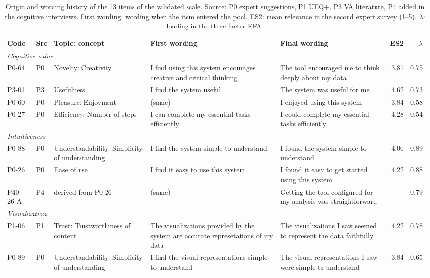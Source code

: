 \begin{table}[tbp]
\centering
\caption{Origin and wording history of the 13 items of the validated scale. Source: P0 expert suggestions, P1 UEQ+, P3 VA literature, P4 added in the cognitive interviews. First wording: wording when the item entered the pool. ES2: mean relevance in the second expert survey (1--5). $\lambda$: loading in the three-factor EFA.}
\label{tab:final-items-history}
\footnotesize
\begin{tabular}{llp{2.6cm}p{4.6cm}p{4.6cm}rr}
\toprule
Code & Src & Topic: concept & First wording & Final wording & ES2 & $\lambda$ \\
\midrule
\multicolumn{7}{l}{\textit{Cognitive value}} \\
P0-64 & P0 & Novelty: Creativity & I find using this system encourages creative and critical thinking & The tool encouraged me to think deeply about my data & 3.81 & 0.75 \\
P3-01 & P3 & Usefulness & I find the system useful & The system was useful for me & 4.62 & 0.73 \\
P0-60 & P0 & Pleasure: Enjoyment & (same) & I enjoyed using this system & 3.84 & 0.58 \\
P0-27 & P0 & Efficiency: Number of steps & I can complete my essential tasks efficiently & I could complete my essential tasks efficiently & 4.28 & 0.54 \\
\midrule
\multicolumn{7}{l}{\textit{Intuitiveness}} \\
P0-88 & P0 & Understandability: Simplicity of understanding & I find the system simple to understand & I found the system simple to understand & 4.00 & 0.89 \\
P0-26 & P0 & Ease of use & I find it easy to use this system & I found it easy to get started using this system & 4.22 & 0.88 \\
P40-26-A & P4 & derived from P0-26 & (same) & Getting the tool configured for my analysis was straightforward & -- & 0.79 \\
\midrule
\multicolumn{7}{l}{\textit{Visualization}} \\
P1-06 & P1 & Trust: Trustworthiness of content & The visualizations provided by the system are accurate represetations of my data & The visualizations I saw seemed to represent the data faithfully & 4.22 & 0.78 \\
P0-89 & P0 & Understandability: Simplicity of understanding & I find the visual representations simple to understand & The visual representations I saw were simple to understand & 3.84 & 0.65 \\

\end{tabular}
\end{table}
